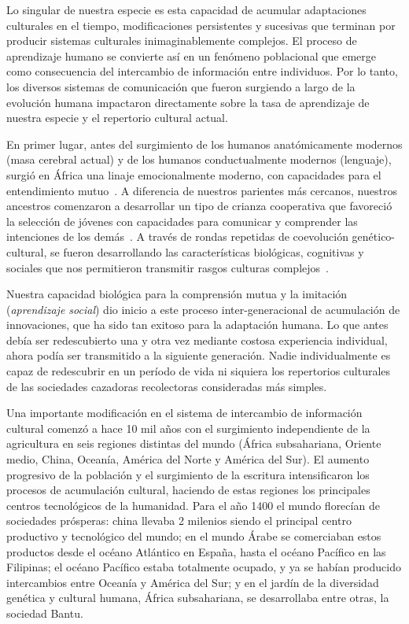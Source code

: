 \documentclass[a4paper,11pt]{book}
\theoremstyle{definition}
\begin{document}

Lo singular de nuestra especie es esta capacidad de acumular adaptaciones culturales en el tiempo, modificaciones persistentes y sucesivas que terminan por producir sistemas culturales inimaginablemente complejos.
%
El proceso de aprendizaje humano se convierte así en un fenómeno poblacional que emerge como consecuencia del intercambio de información entre individuos.
%
Por lo tanto, los diversos sistemas de comunicación que fueron surgiendo a largo de la evolución humana impactaron directamente sobre la tasa de aprendizaje de nuestra especie y el repertorio cultural actual.


En primer lugar, antes del surgimiento de los humanos anatómicamente modernos (masa cerebral actual) y de los humanos conductualmente modernos (lenguaje), surgió en África una linaje emocionalmente moderno, con capacidades para el entendimiento mutuo~\cite{hrdy2020-emotionallyModern}.
%
A diferencia de nuestros parientes más cercanos, nuestros ancestros comenzaron a desarrollar un tipo de crianza cooperativa que favoreció la selección de jóvenes con capacidades para comunicar y comprender las intenciones de los demás~\cite{hrdy2020-emotionallyModern}.
%
A través de rondas repetidas de coevolución genético-cultural, se fueron desarrollando las características biológicas, cognitivas y sociales que nos permitieron transmitir rasgos culturas complejos~\cite{Jones2011}.

%

Nuestra capacidad biológica para la comprensión mutua y la imitación (\emph{aprendizaje social}) dio inicio a este proceso inter-generacional de acumulación de innovaciones, que ha sido tan exitoso para la adaptación humana.
%
Lo que antes debía ser redescubierto una y otra vez mediante costosa experiencia individual, ahora podía ser transmitido a la siguiente generación.
%
Nadie individualmente es capaz de redescubrir en un período de vida ni siquiera los repertorios culturales de las sociedades cazadoras recolectoras consideradas más simples.


Una importante modificación en el sistema de intercambio de información cultural comenzó a hace 10 mil años con el surgimiento independiente de la agricultura en seis regiones distintas del mundo (África subsahariana, Oriente medio, China, Oceanía, América del Norte y América del Sur).
%
El aumento progresivo de la población y el surgimiento de la escritura intensificaron los procesos de acumulación cultural, haciendo de estas regiones los principales centros tecnológicos de la humanidad.
%
Para el año 1400 el mundo florecían de sociedades prósperas: china llevaba 2 milenios siendo el principal centro productivo y tecnológico del mundo; en el mundo Árabe se comerciaban estos productos desde el océano Atlántico en España, hasta el océano Pacífico en las Filipinas; el océano Pacífico estaba totalmente ocupado, y ya se habían producido intercambios entre Oceanía y América del Sur; y en el jardín de la diversidad genética y cultural humana, África subsahariana, se desarrollaba entre otras, la sociedad Bantu.
\end{document}

